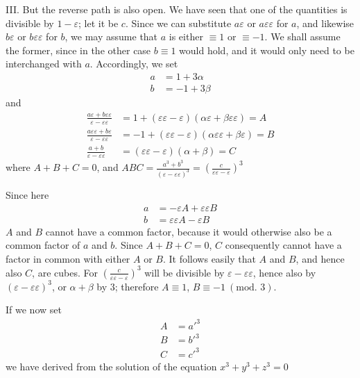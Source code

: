 III. But the reverse path is also open. We have seen that one of the quantities is divisible by $1-\varepsilon$; let it be $c$. Since we can substitute $a\varepsilon$ or $a\varepsilon\varepsilon$ for $a$, and likewise $b\varepsilon$ or $b\varepsilon\varepsilon$ for $b$, we may assume that $a$ is either $\equiv1$ or $\equiv-1$. We shall assume the former, since in the other case $b\equiv1$ would hold, and it would only need to be interchanged with $a$. Accordingly, we set
\[
\begin{aligned}
a&=1+3\alpha\\
b&=-1+3\beta
\end{aligned}
\]
and
\[
\begin{aligned}
\frac{a\varepsilon+b\varepsilon\varepsilon}{\varepsilon-\varepsilon\varepsilon}&=1+(\varepsilon\varepsilon-\varepsilon)(\alpha\varepsilon+\beta\varepsilon\varepsilon)=A\\
\frac{a\varepsilon\varepsilon+b\varepsilon}{\varepsilon-\varepsilon\varepsilon}&=-1+(\varepsilon\varepsilon-\varepsilon)(\alpha\varepsilon\varepsilon+\beta\varepsilon)=B\\
\frac{a+b}{\varepsilon-\varepsilon\varepsilon}&=(\varepsilon\varepsilon-\varepsilon)(\alpha+\beta)=C
\end{aligned}
\]
where $A+B+C=0$, and $ABC=\frac{a^3+b^3}{(\varepsilon-\varepsilon\varepsilon)^3}=\left(\frac c{\varepsilon\varepsilon-\varepsilon}\right)^3$

Since here
\[
\begin{aligned}
a&=-\varepsilon A+\varepsilon\varepsilon B\\
b&=\varepsilon\varepsilon A-\varepsilon B
\end{aligned}
\]
$A$ and $B$ cannot have a common factor, because it would otherwise also be a common factor of $a$ and $b$. Since $A+B+C=0$, $C$ consequently cannot have a factor in common with either $A$ or $B$. It follows easily that $A$ and $B$, and hence also $C$, are cubes. For $\left(\frac c{\varepsilon\varepsilon-\varepsilon}\right)^3$ will be divisible by $\varepsilon-\varepsilon\varepsilon$, hence also by $(\varepsilon-\varepsilon\varepsilon)^3$, or $\alpha+\beta$ by $3$; therefore $A\equiv1$, $B\equiv-1\ (\text{mod. }3)$.

If we now set
\[
\begin{aligned}
A&=a'^3\\
B&=b'^3\\
C&=c'^3
\end{aligned}
\]
we have derived from the solution of the equation $x^3+y^3+z^3=0$


